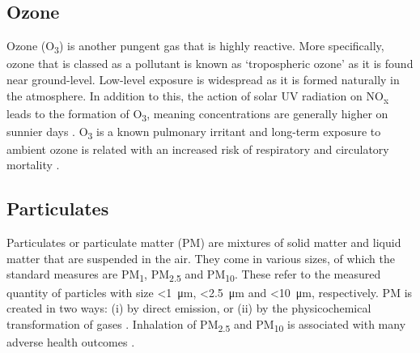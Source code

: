 \documentclass[11pt]{report}
\begin{document}
%


\subsection{Ozone}

Ozone (O\textsubscript{3}) is another pungent gas that is highly reactive. More specifically, ozone that is classed as a pollutant is known as `tropospheric ozone' as it is found near ground-level. Low-level exposure is widespread as it is formed naturally in the atmosphere. In addition to this, the action of solar UV radiation on NO\textsubscript{x} leads to the formation of O\textsubscript{3}, meaning concentrations are generally higher on sunnier days \citep{Brook2004cardiostmnt}. O\textsubscript{3} is a known pulmonary irritant \citep{Ebi2008ozonePMhealth} and long-term exposure to ambient ozone is related with an increased risk of respiratory and circulatory mortality \citep{Turner2016ozonemortality}.

\subsection{Particulates}

Particulates or particulate matter (PM) are mixtures of solid matter and liquid matter that are suspended in the air. They come in various sizes, of which the standard measures are PM\textsubscript{1}, PM\textsubscript{2.5} and PM\textsubscript{10}. These refer to the measured quantity of particles with size \textless \SI{1}{\micro\metre}, \textless \SI{2.5}{\micro\metre} and \textless \SI{10}{\micro\metre}, respectively. PM is created in two ways: (i) by direct emission, or (ii) by the physicochemical transformation of gases \citep{Brook2004cardiostmnt}. Inhalation of PM\textsubscript{2.5} and PM\textsubscript{10} is associated with many adverse health outcomes \citep{pope1995particulate,pope2002lungcancercardiomortality,Anderson2012clearingtheair,Beelen2014escapeproject}.
\end{document}
